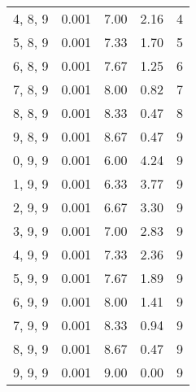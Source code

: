 \documentclass[12pt]{article}
\begin{document}
\begin{tabular}{c || c || c | c | c}
4, 8, 9 & 0.001 & 7.00 & 2.16 & 4 \\
5, 8, 9 & 0.001 & 7.33 & 1.70 & 5 \\
6, 8, 9 & 0.001 & 7.67 & 1.25 & 6 \\
7, 8, 9 & 0.001 & 8.00 & 0.82 & 7 \\
8, 8, 9 & 0.001 & 8.33 & 0.47 & 8 \\
9, 8, 9 & 0.001 & 8.67 & 0.47 & 9 \\
0, 9, 9 & 0.001 & 6.00 & 4.24 & 9 \\
1, 9, 9 & 0.001 & 6.33 & 3.77 & 9 \\
2, 9, 9 & 0.001 & 6.67 & 3.30 & 9 \\
3, 9, 9 & 0.001 & 7.00 & 2.83 & 9 \\
4, 9, 9 & 0.001 & 7.33 & 2.36 & 9 \\
5, 9, 9 & 0.001 & 7.67 & 1.89 & 9 \\
6, 9, 9 & 0.001 & 8.00 & 1.41 & 9 \\
7, 9, 9 & 0.001 & 8.33 & 0.94 & 9 \\
8, 9, 9 & 0.001 & 8.67 & 0.47 & 9 \\
9, 9, 9 & 0.001 & 9.00 & 0.00 & 9 \\
\end{tabular}
\end{document}

